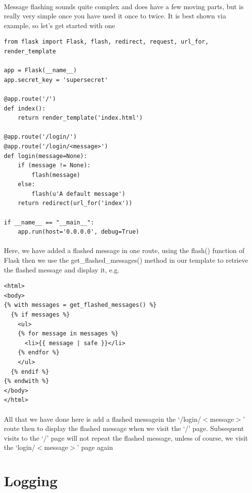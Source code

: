 \documentclass[12pt, a4paper, oneside]{book}
\begin{document}
{\paragraph{} Message flashing sounds quite complex and does have a few moving parts, but is really very simple once you have used it once to twice. It is best shown via example, so let's get started with one

\begin{lstlisting}
from flask import Flask, flash, redirect, request, url_for, render_template

app = Flask(__name__)
app.secret_key = 'supersecret'

@app.route('/')
def index():
    return render_template('index.html')

@app.route('/login/')
@app.route('/login/<message>')
def login(message=None):
    if (message != None):
        flash(message)
    else:
        flash(u'A default message')
    return redirect(url_for('index'))

if __name__ == "__main__":
    app.run(host='0.0.0.0', debug=True)
\end{lstlisting}
\paragraph{} Here, we have added a flashed message in one route, using the flash() function of Flask then we use the get\_flashed\_messages() method in our template to retrieve the flashed message and display it, e.g.

\begin{lstlisting}
<html>
<body>
{% with messages = get_flashed_messages() %}
  {% if messages %}
    <ul>
    {% for message in messages %}
      <li>{{ message | safe }}</li>
    {% endfor %}
    </ul>
  {% endif %}
{% endwith %}
</body>
</html>
\end{lstlisting}

\paragraph{} All that we have done here is add a flashed messagein the `/login/$<$message$>$' route then to display the flashed message when we visit the `/' page. Subsequent visits to the `/' page will not repeat the flashed message, unless of course, we visit the `login/$<$message$>$' page again

\section{Logging}
\label{logging}
}
\end{document}

